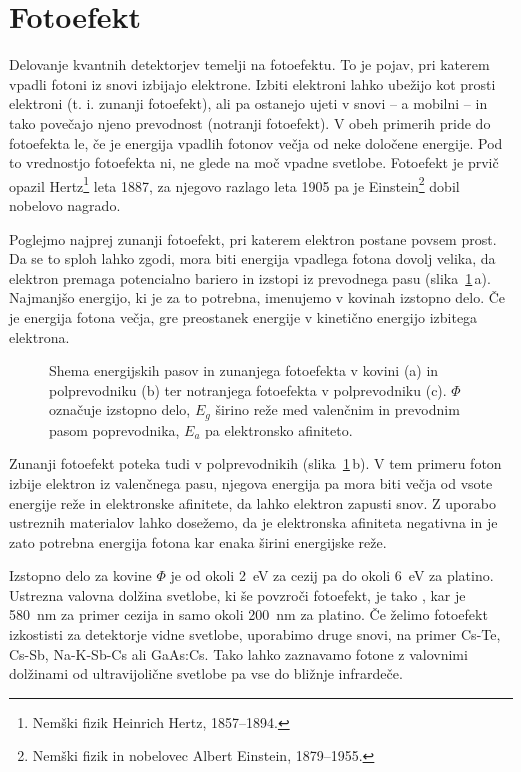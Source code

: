 \section{Fotoefekt}
Delovanje kvantnih detektorjev temelji na fotoefektu. To je pojav, pri katerem vpadli
fotoni iz snovi izbijajo elektrone. Izbiti elektroni lahko ubežijo kot prosti elektroni
(t. i. zunanji fotoefekt), ali pa ostanejo ujeti v snovi -- a mobilni -- in tako povečajo 
njeno prevodnost (notranji fotoefekt). V obeh primerih pride do fotoefekta le, 
če je energija vpadlih fotonov večja od neke določene energije.
Pod to vrednostjo fotoefekta ni, ne glede na moč vpadne svetlobe.
Fotoefekt je prvič opazil Hertz\footnote{Nemški fizik Heinrich Hertz, 1857--1894.} 
leta 1887, za njegovo razlago leta
1905 pa je Einstein\footnote{Nemški fizik in nobelovec Albert Einstein, 1879--1955.} 
dobil nobelovo nagrado. 

Poglejmo najprej zunanji fotoefekt, pri katerem elektron postane povsem prost. 
Da se to sploh lahko zgodi, mora biti energija vpadlega fotona dovolj velika, da 
elektron premaga potencialno bariero in izstopi iz prevodnega pasu (slika~\ref{fig:Nivoji}\,a). 
Najmanjšo energijo, ki je za to potrebna, imenujemo v kovinah izstopno delo. 
Če je energija fotona večja, gre preostanek energije v kinetično energijo izbitega
elektrona.

\begin{figure}[h]
\centering
\def\svgwidth{140truemm} 

\caption{Shema energijskih pasov in zunanjega fotoefekta v kovini (a) in polprevodniku (b) ter
notranjega fotoefekta v polprevodniku (c). $\Phi$ označuje izstopno delo, $E_g$ širino reže 
med valenčnim in prevodnim pasom poprevodnika,
$E_a$ pa elektronsko afiniteto. }
\label{fig:Nivoji}
\end{figure}

Zunanji fotoefekt poteka tudi v polprevodnikih (slika~\ref{fig:Nivoji}\,b). 
V tem primeru foton izbije elektron iz valenčnega pasu, njegova energija pa mora biti 
večja od vsote energije reže in elektronske afinitete, da lahko elektron zapusti snov. 
Z uporabo ustreznih materialov lahko dosežemo, da je elektronska afiniteta
negativna in je zato potrebna energija fotona kar enaka širini energijske reže.

Izstopno delo za kovine $\Phi$ je od okoli 2~eV za cezij pa do okoli 6~eV za platino. 
Ustrezna valovna dolžina svetlobe, ki še povzroči fotoefekt, je tako 
\beq
\lambda \leq {},
\eeq
kar je 580~nm za primer cezija in samo okoli 200~nm za platino. Če želimo fotoefekt
izkostisti za detektorje vidne svetlobe, uporabimo druge snovi,
na primer Cs-Te, Cs-Sb, Na-K-Sb-Cs ali GaAs:Cs. 
Tako lahko zaznavamo fotone z valovnimi dolžinami od ultravijolične svetlobe 
pa vse do bližnje infrardeče. 


